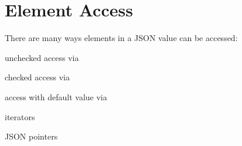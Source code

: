 \chapter{Element Access}
\hypertarget{md_build_2dt__core_2__deps_2nlohmann__json-src_2docs_2mkdocs_2docs_2features_2element__access_2index}{}\label{md_build_2dt__core_2__deps_2nlohmann__json-src_2docs_2mkdocs_2docs_2features_2element__access_2index}
\label{md_build_2dt__core_2__deps_2nlohmann__json-src_2docs_2mkdocs_2docs_2features_2element__access_2index_autotoc_md1359}%
%
 There are many ways elements in a JSON value can be accessed\+:


\begin{DoxyItemize}
\item unchecked access via 
\item checked access via 
\item access with default value via 
\item iterators
\item JSON pointers 
\end{DoxyItemize}